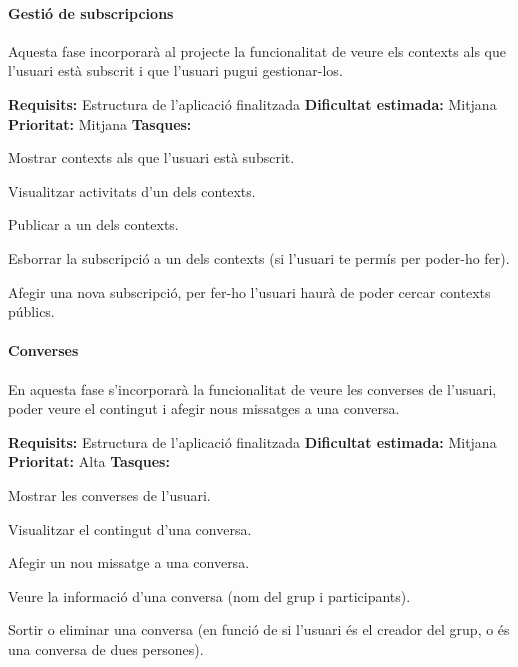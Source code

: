 \paragraph{Gestió de subscripcions\\}
Aquesta fase incorporarà al projecte la funcionalitat de veure els contexts als que l'usuari està subscrit i que l'usuari pugui gestionar-los.

\textbf{Requisits:}  Estructura de l'aplicació finalitzada \newline
\textbf{Dificultat estimada:}  Mitjana \newline
\textbf{Prioritat:}  Mitjana \newline
\textbf{Tasques:} 
\begin{compactitem}
    \item Mostrar contexts als que l'usuari està subscrit.
    \item Visualitzar activitats d'un dels contexts.
    \item Publicar a un dels contexts.
    \item Esborrar la subscripció a un dels contexts (si l'usuari te permís per poder-ho fer).
    \item Afegir una nova subscripció, per fer-ho l'usuari haurà de poder cercar contexts públics.
\end{compactitem}


\paragraph{Converses\\}
En aquesta fase s'incorporarà la funcionalitat de veure les converses de l'usuari, poder veure el contingut i afegir nous missatges a una conversa.

\textbf{Requisits:}  Estructura de l'aplicació finalitzada \newline
\textbf{Dificultat estimada:}  Mitjana \newline
\textbf{Prioritat:}  Alta \newline
\textbf{Tasques:} 
\begin{compactitem}
    \item Mostrar les converses de l'usuari.
    \item Visualitzar el contingut d'una conversa.
    \item Afegir un nou missatge a una conversa.
    \item Veure la informació d'una conversa (nom del grup i participants).
    \item Sortir o eliminar una conversa (en funció de si l'usuari és el creador del grup, o és una conversa de dues persones).
\end{compactitem}

